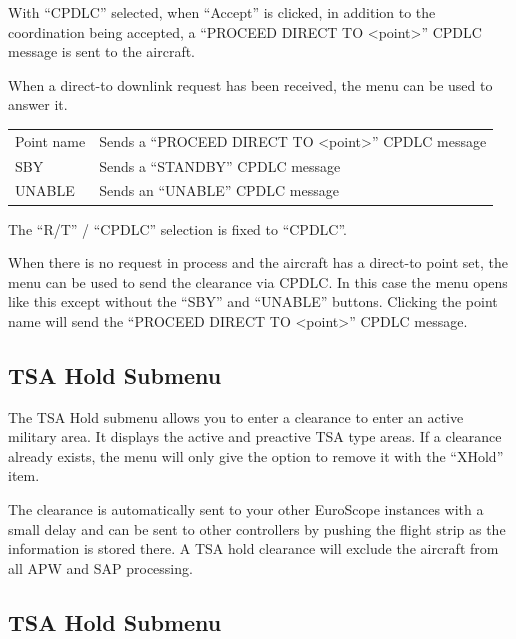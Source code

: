 \documentclass[a4paper,oneside,11pt]{memoir}
\begin{document}
\bigskip

With “CPDLC” selected, when “Accept” is clicked, in addition to the coordination being accepted, a “PROCEED DIRECT TO <point>” CPDLC message is sent to the aircraft.


When a direct-to downlink request has been received, the menu can be used to answer it.

\bigskip

\begin{longtable}{p{5cm} p{7.5cm}}
Point name  & Sends a “PROCEED DIRECT TO <point>” CPDLC message\\
SBY         & Sends a “STANDBY” CPDLC message\\
UNABLE      & Sends an “UNABLE” CPDLC message\\
\end{longtable}   

\bigskip

The “R/T” / “CPDLC” selection is fixed to “CPDLC”.


When there is no request in process and the aircraft has a direct-to point set, the menu can be used to send the clearance via CPDLC. In this case the menu opens like this except without the “SBY” and “UNABLE” buttons. Clicking the point name will send the “PROCEED DIRECT TO <point>” CPDLC message.

\subsection*{TSA Hold Submenu}

The TSA Hold submenu allows you to enter a clearance to enter an active military area. It displays the active and preactive TSA type areas. If a clearance already exists, the menu will only give the option to remove it with the “XHold” item.

\bigskip

The clearance is automatically sent to your other EuroScope instances with a small delay and can be sent to other controllers by pushing the flight strip as the information is stored there. A TSA hold clearance will exclude the aircraft from all APW and SAP processing.

\subsection*{TSA Hold Submenu}
\end{document}
